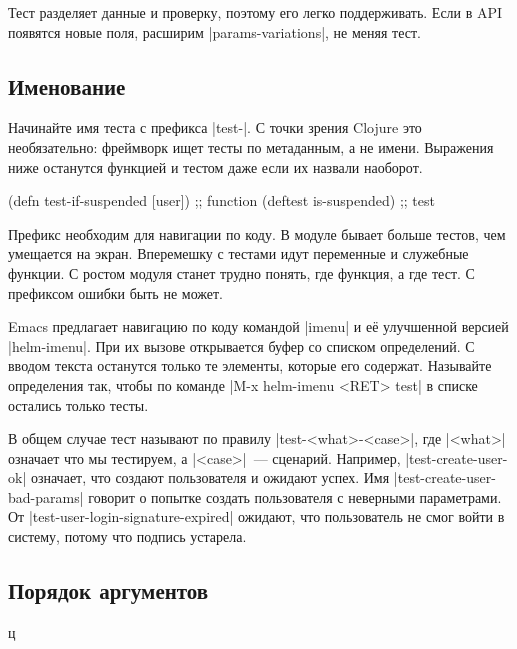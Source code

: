 Тест разделяет данные и проверку, поэтому его легко поддерживать. Если в API
появятся новые поля, расширим \spverb|params-variations|, не меняя тест.

\subsection{Именование}


Начинайте имя теста с префикса \spverb|test-|. С точки зрения Clojure это
необязательно: фреймворк ищет тесты по метаданным, а не имени. Выражения ниже
останутся функцией и тестом даже если их назвали наоборот.

\begin{english}
  \begin{clojure}
(defn test-if-suspended [user]) ;; function
(deftest is-suspended)          ;; test
  \end{clojure}
\end{english}

Префикс необходим для навигации по коду. В модуле бывает больше тестов, чем
умещается на экран. Вперемешку с тестами идут переменные и служебные функции. С
ростом модуля станет трудно понять, где функция, а где тест. С префиксом ошибки
быть не может.


Emacs предлагает навигацию по коду командой \spverb|imenu| и её улучшенной
версией \spverb|helm-imenu|. При их вызове открывается буфер со списком
определений. С вводом текста останутся только те элементы, которые его
содержат. Называйте определения так, чтобы по команде \spverb|M-x helm-imenu <RET> test|
в списке остались только тесты.

В общем случае тест называют по правилу \spverb|test-<what>-<case>|, где
\spverb|<what>| означает что мы тестируем, а \spverb|<case>|~---
сценарий. Например, \spverb|test-create-user-ok| означает, что создают
пользователя и ожидают успех. Имя \spverb|test-create-user-bad-params| говорит о
попытке создать пользователя с неверными параметрами. От
\spverb|test-user-login-signature-expired| ожидают, что пользователь не смог
войти в систему, потому что подпись устарела.

\subsection{Порядок аргументов}

ц

